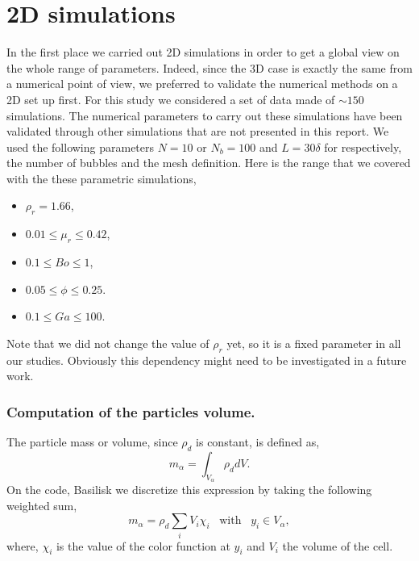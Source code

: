 \section{2D simulations}
In the first place we carried out 2D simulations in order to get a global view on the whole range of parameters.
Indeed, since the 3D case is exactly the same from a numerical point of view, we preferred to validate the numerical methods on a 2D set up first. 
For this study we considered a set of data made of $\sim 150$ simulations. 
The numerical parameters to carry out these simulations have been validated through other simulations that are not presented in this report. 
We used the following parameters $N = 10$ or  $N_b = 100$ and $L = 30 \delta$ for respectively, the number of bubbles and the mesh definition. 
Here is the range that we covered with the these parametric simulations, 
\begin{multicols}{2}
    \begin{itemize}
        \item $\rho_r = 1.66$,
        \item $0.01 \leq  \mu_r \leq 0.42$,
        \item $0.1  \leq  Bo    \leq 1$,
    \end{itemize}
    \begin{itemize}
        \item $0.05 \leq  \phi  \leq 0.25$.
        \item $0.1 \leq  Ga  \leq 100$.
    \end{itemize}
\end{multicols}
Note that we did not change the value of $\rho_r$ yet, so it is a fixed parameter in all our studies.
Obviously this dependency might need to be investigated in a future work.


\subsubsection*{Computation of the particles volume.}
The particle mass or volume, since $\rho_d$ is constant, is defined as, 
\begin{equation}
    m_\alpha 
    = \int_{V_\alpha} \rho_d dV.
\end{equation}
 On the code, Basilisk we discretize this expression by taking the following weighted sum,
\begin{equation}
    m_\alpha = \rho_d\sum_{i} V_i \chi_i \;\;\; \text{with} \;\;\;y_i \in V_\alpha,
\end{equation}
where, $\chi_i$ is the value of the color function at $y_i$ and $V_i$ the volume of the cell.
